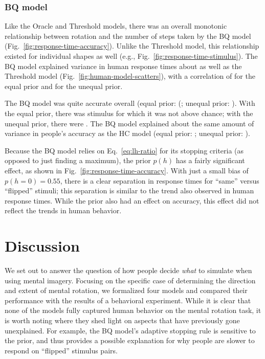 \documentclass[10pt,letterpaper]{article}
\newcommand{\Oc}[0]{Oracle}
\newcommand{\Th}[0]{Threshold}
\newcommand{\Hc}[0]{HC}
\newcommand{\Bq}[0]{BQ}
\begin{document}
\subsubsection{\Bq{} model}

Like the \Oc{} and \Th{} models, there was an overall monotonic
relationship between rotation and the number of steps taken by the
\Bq{} model (Fig.~\ref{fig:response-time-accuracy}). Unlike the \Th{}
model, this relationship existed for individual shapes as well (e.g.,
Fig.~\ref{fig:response-time-stimulus}).  The \Bq{} model explained
variance in human response times about as well as the \Th{} model
(Fig.~\ref{fig:human-model-scatters}), with a correlation of
\BqTimeCorr{} for the equal prior and \BqpTimeCorr{} for the unequal
prior.

The \Bq{} model was quite accurate overall (equal prior:
(\BqAccuracy{}; unequal prior: \BqpAccuracy{}). With the equal prior,
there was \BqNumChance{} stimulus for which it was not above chance;
with the unequal prior, there were \BqpNumChance{}. The \Bq{} model
explained about the same amount of variance in people's accuracy as
the \Hc{} model (equal prior: \BqAccuracyCorr{}; unequal prior:
\BqpAccuracyCorr{}).

Because the \Bq{} model relies on Eq.~\ref{eq:lh-ratio} for its
stopping criteria (as opposed to just finding a maximum), the prior
$p(h)$ has a fairly significant effect, as shown in
Fig.~\ref{fig:response-time-accuracy}. With just a small bias of
$p(h=0)=0.55$, there is a clear separation in response times for
``same'' versus ``flipped'' stimuli; this separation is similar to the
trend also observed in human response times. While the prior also had
an effect on accuracy, this effect did not reflect the trends in human
behavior.

\section{Discussion}

We set out to answer the question of how people decide \textit{what}
to simulate when using mental imagery. Focusing on the specific case
of determining the direction and extent of mental rotation, we
formalized four models and compared their performance with the results
of a behavioral experiment. While it is clear that none of the models
fully captured human behavior on the mental rotation task, it is worth
noting where they shed light on aspects that have previously gone
unexplained.  For example, the \Bq{} model's adaptive stopping rule is
sensitive to the prior, and thus provides a possible explanation for
why people are slower to respond on ``flipped'' stimulus pairs.
\end{document}
